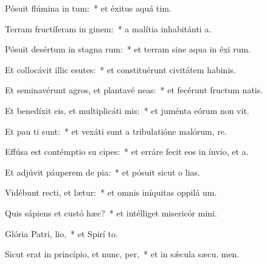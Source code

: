 \item Pósuit flúmina in tum:~* et éxitus aquá  tim.
\item Terram fructíferam in ginem:~* a malítia inhabitánti  a.
\item Pósuit desértum in stagna rum:~* et terram sine aqua in éxi rum.
\item Et collocávit illic esutes:~* et constituérunt civitátem habinis.
\item Et seminavérunt agros, et plantavé neas:~* et fecérunt fructum natis.
\item Et benedíxit eis, et multiplicáti  mis:~* et juménta eórum non vit.
\item Et pau ti sunt:~* et vexáti sunt a tribulatióne malórum,  re.
\item Effúsa est contémptio su cipes:~* et erráre fecit eos in ínvio, et   a.
\item Et adjúvit páuperem de pia:~* et pósuit sicut o lias.
\item Vidébunt recti, et lætur:~* et omnis iníquitas oppilá  um.
\item Quis sápiens et custó hæc?~* et intélliget misericór mini.
\item Glória Patri,  lio,~* et Spirí to.
\item Sicut erat in princípio, et nunc,  per,~* et in sǽcula sæcu. men.
